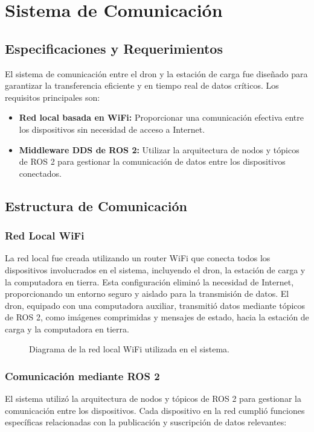 \section{Sistema de Comunicación}

    \subsection{Especificaciones y Requerimientos} 
    El sistema de comunicación entre el dron y la estación de carga fue diseñado para garantizar la transferencia eficiente y en tiempo real de datos críticos. Los requisitos principales son:
    
    \begin{itemize}
        \item \textbf{Red local basada en WiFi:} 
        Proporcionar una comunicación efectiva entre los dispositivos sin necesidad de acceso a Internet.
        \item \textbf{Middleware DDS de ROS 2:} 
        Utilizar la arquitectura de nodos y tópicos de ROS 2 para gestionar la comunicación de datos entre los dispositivos conectados.
    \end{itemize}
    
    \subsection{Estructura de Comunicación} 
    
    \subsubsection{Red Local WiFi} 
    La red local fue creada utilizando un router WiFi que conecta todos los dispositivos involucrados en el sistema, incluyendo el dron, la estación de carga y la computadora en tierra. Esta configuración eliminó la necesidad de Internet, proporcionando un entorno seguro y aislado para la transmisión de datos. El dron, equipado con una computadora auxiliar, transmitió datos mediante tópicos de ROS 2, como imágenes comprimidas y mensajes de estado, hacia la estación de carga y la computadora en tierra.
    
    \begin{figure}
        \centering
        \caption{Diagrama de la red local WiFi utilizada en el sistema.}
    \end{figure}
    
    \subsubsection{Comunicación mediante ROS 2} 
    El sistema utilizó la arquitectura de nodos y tópicos de ROS 2 para gestionar la comunicación entre los dispositivos. Cada dispositivo en la red cumplió funciones específicas relacionadas con la publicación y suscripción de datos relevantes:
    
